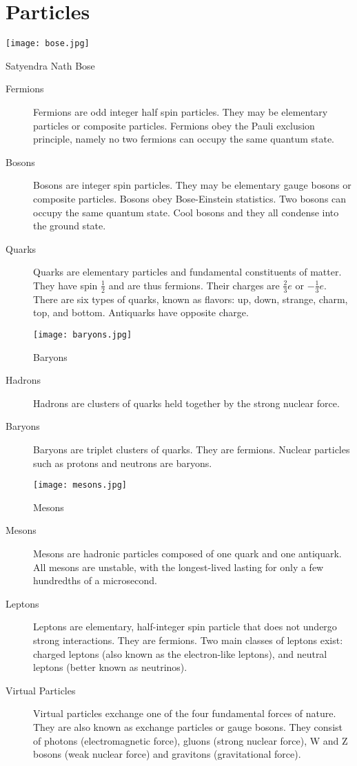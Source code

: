 \section{Particles}

\begin{marginfigure}[0pt]
  \texttt{[image: bose.jpg]}
  \caption{Satyendra Nath Bose}
  \label{fig:fig}
\end{marginfigure}

\begin{description}  
\item [Fermions]  Fermions are odd integer half spin particles.  They may be elementary particles or composite particles.  Fermions obey the Pauli exclusion principle, namely no two fermions can occupy the same quantum state.
\item [Bosons] Bosons are integer spin particles.  They may be elementary gauge bosons or composite particles.  Bosons obey Bose-Einstein statistics. Two bosons can occupy the same quantum state.  Cool bosons and they all condense into the ground state.
\item [Quarks]  Quarks are elementary particles and fundamental constituents of matter.  They have spin $\frac{1}{2}$ and are thus fermions.  Their charges are $\frac{2}{3}e$ or $-\frac{1}{3}e$.  There are six types of quarks, known as flavors: up, down, strange, charm, top, and bottom.  Antiquarks have opposite charge.
\begin{marginfigure}[0pt]
  \texttt{[image: baryons.jpg]}
  \caption{Baryons}
  \label{fig:fig}
\end{marginfigure}
\item [Hadrons]  Hadrons are clusters of quarks held together by the strong nuclear force.
\item [Baryons]  Baryons are triplet clusters of quarks.  They are fermions.  Nuclear particles such as protons and neutrons are baryons. 
\begin{marginfigure}[20pt]
  \texttt{[image: mesons.jpg]}
  \caption{Mesons}
  \label{fig:fig}
\end{marginfigure}

\item [Mesons]  Mesons are hadronic particles composed of one quark and one antiquark.  All mesons are unstable, with the longest-lived lasting for only a few hundredths of a microsecond. 
\item [Leptons]  Leptons are elementary, half-integer spin particle that does not undergo strong interactions.  They are fermions. Two main classes of leptons exist: charged leptons (also known as the electron-like leptons), and neutral leptons (better known as neutrinos).
\item [Virtual Particles]  Virtual particles exchange one of the four fundamental forces of nature.  They are also known as exchange particles or gauge bosons.  They consist of photons (electromagnetic force), gluons (strong nuclear force), W and Z bosons (weak nuclear force) and gravitons (gravitational force).
\end{description}

